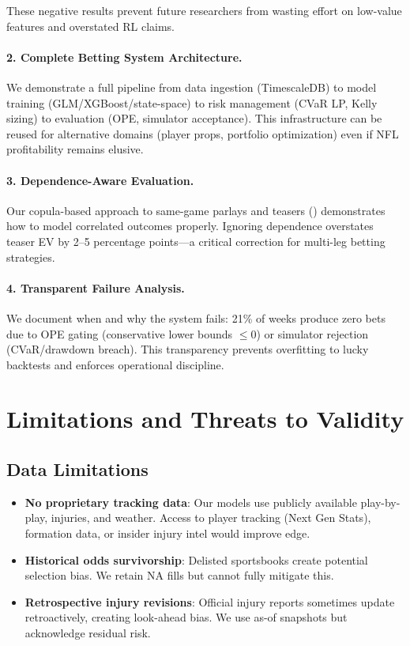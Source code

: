 These negative results prevent future researchers from wasting effort on low-value features and overstated RL claims.

\paragraph{2. Complete Betting System Architecture.}
We demonstrate a full pipeline from data ingestion (TimescaleDB) to model training (GLM/XGBoost/state-space) to risk management (CVaR LP, Kelly sizing) to evaluation (OPE, simulator acceptance). This infrastructure can be reused for alternative domains (player props, portfolio optimization) even if NFL profitability remains elusive.

\paragraph{3. Dependence-Aware Evaluation.}
Our copula-based approach to same-game parlays and teasers () demonstrates how to model correlated outcomes properly. Ignoring dependence overstates teaser EV by 2--5 percentage points—a critical correction for multi-leg betting strategies.

\paragraph{4. Transparent Failure Analysis.}
We document when and why the system fails: 21\% of weeks produce zero bets due to OPE gating (conservative lower bounds $\le 0$) or simulator rejection (CVaR/drawdown breach). This transparency prevents overfitting to lucky backtests and enforces operational discipline.

\section{Limitations and Threats to Validity}

\subsection{Data Limitations}
\begin{itemize}
  \item \textbf{No proprietary tracking data}: Our models use publicly available play-by-play, injuries, and weather. Access to player tracking (Next Gen Stats), formation data, or insider injury intel would improve edge.
  \item \textbf{Historical odds survivorship}: Delisted sportsbooks create potential selection bias. We retain NA fills but cannot fully mitigate this.
  \item \textbf{Retrospective injury revisions}: Official injury reports sometimes update retroactively, creating look-ahead bias. We use as-of snapshots but acknowledge residual risk.
\end{itemize}

